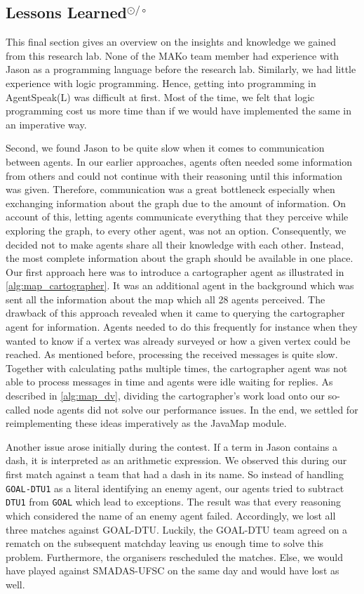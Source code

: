 \subsection[Lessons Learned]{Lessons Learned$^{\odot/\circ}$}\label{con:learned}
This final section gives an overview on the insights and knowledge we gained from this research lab.
None of the MAKo team member had experience with Jason as a programming language before the research lab.
Similarly, we had little experience with logic programming.
Hence, getting into programming in AgentSpeak(L) was difficult at first.
Most of the time, we felt that logic programming cost us more time than if we would have implemented the same in an imperative way.

Second, we found Jason to be quite slow when it comes to communication between agents.
In our earlier approaches, agents often needed some information from others and could not continue with their reasoning until this information was given.
Therefore, communication was a great bottleneck especially when exchanging information about the graph due to the amount of information.
On account of this, letting agents communicate everything that they perceive while exploring the graph, to every other agent, was not an option.
Consequently, we decided not to make agents share all their knowledge with each other.
Instead, the most complete information about the graph should be available in one place.
Our first approach here was to introduce a cartographer agent as illustrated in \autoref{alg:map_cartographer}.
It was an additional agent in the background which was sent all the information about the map which all 28 agents perceived.
The drawback of this approach revealed when it came to querying the cartographer agent for information.
Agents needed to do this frequently for instance when they wanted to know if a vertex was already surveyed or how a given vertex could be reached.
As mentioned before, processing the received messages is quite slow.
Together with calculating paths multiple times, the cartographer agent was not able to process messages in time and agents were idle waiting for replies.
As described in \autoref{alg:map_dv}, dividing the cartographer's work load onto our so-called node agents did not solve our performance issues.
In the end, we settled for reimplementing these ideas imperatively as the JavaMap module.

Another issue arose initially during the contest.
If a term in Jason contains a dash, it is interpreted as an arithmetic expression.
We observed this during our first match against a team that had a dash in its name.
So instead of handling \texttt{GOAL-DTU1} as a literal identifying an enemy agent, our agents tried to subtract \texttt{DTU1} from \texttt{GOAL} which lead to exceptions.
The result was that every reasoning which considered the name of an enemy agent failed.
Accordingly, we lost all three matches against GOAL-DTU.
Luckily, the GOAL-DTU team agreed on a rematch on the subsequent matchday leaving us enough time to solve this problem.
Furthermore, the organisers rescheduled the matches.
Else, we would have played against SMADAS-UFSC on the same day and would have lost as well.

